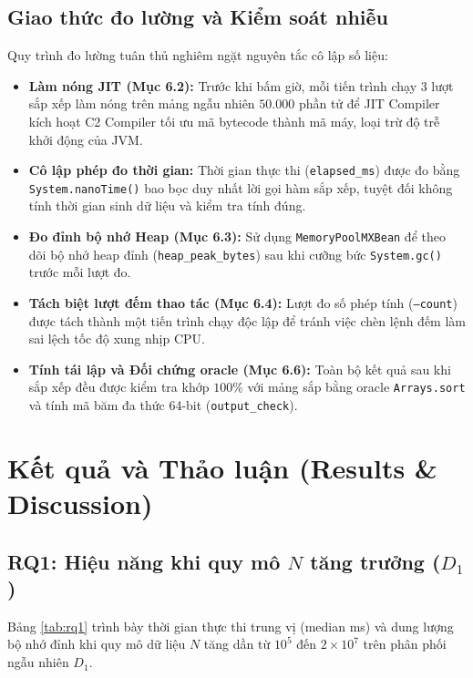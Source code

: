 \documentclass[conference]{IEEEtran}
\begin{document}
\subsection{Giao thức đo lường và Kiểm soát nhiễu}
Quy trình đo lường tuân thủ nghiêm ngặt nguyên tắc cô lập số liệu:
\begin{itemize}
    \item \textbf{Làm nóng JIT (Mục 6.2):} Trước khi bấm giờ, mỗi tiến trình chạy 3 lượt sắp xếp làm nóng trên mảng ngẫu nhiên $50.000$ phần tử để JIT Compiler kích hoạt C2 Compiler tối ưu mã bytecode thành mã máy, loại trừ độ trễ khởi động của JVM.
    \item \textbf{Cô lập phép đo thời gian:} Thời gian thực thi (\texttt{elapsed\_ms}) được đo bằng \texttt{System.nanoTime()} bao bọc duy nhất lời gọi hàm sắp xếp, tuyệt đối không tính thời gian sinh dữ liệu và kiểm tra tính đúng.
    \item \textbf{Đo đỉnh bộ nhớ Heap (Mục 6.3):} Sử dụng \texttt{MemoryPoolMXBean} để theo dõi bộ nhớ heap đỉnh (\texttt{heap\_peak\_bytes}) sau khi cưỡng bức \texttt{System.gc()} trước mỗi lượt đo.
    \item \textbf{Tách biệt lượt đếm thao tác (Mục 6.4):} Lượt đo số phép tính (\texttt{--count}) được tách thành một tiến trình chạy độc lập để tránh việc chèn lệnh đếm làm sai lệch tốc độ xung nhịp CPU.
    \item \textbf{Tính tái lập và Đối chứng oracle (Mục 6.6):} Toàn bộ kết quả sau khi sắp xếp đều được kiểm tra khớp $100\%$ với mảng sắp bằng oracle \texttt{Arrays.sort} và tính mã băm đa thức 64-bit (\texttt{output\_check}).
\end{itemize}

\section{Kết quả và Thảo luận (Results \& Discussion)}

\subsection{RQ1: Hiệu năng khi quy mô $N$ tăng trưởng ($D_1$)}
Bảng \ref{tab:rq1} trình bày thời gian thực thi trung vị (median ms) và dung lượng bộ nhớ đỉnh khi quy mô dữ liệu $N$ tăng dần từ $10^5$ đến $2\times 10^7$ trên phân phối ngẫu nhiên $D_1$.
\end{document}
